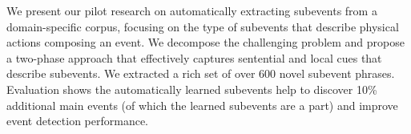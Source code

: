 We present our pilot research on automatically extracting subevents from a domain-specific corpus, focusing on the type of subevents that describe physical actions composing an event. We decompose the challenging problem and propose a two-phase approach that effectively captures sentential and local cues that describe subevents. We extracted a rich set of over 600 novel subevent phrases. Evaluation shows the automatically learned subevents help to discover 10\% additional main events (of which the learned subevents are a part) and improve event detection performance.
